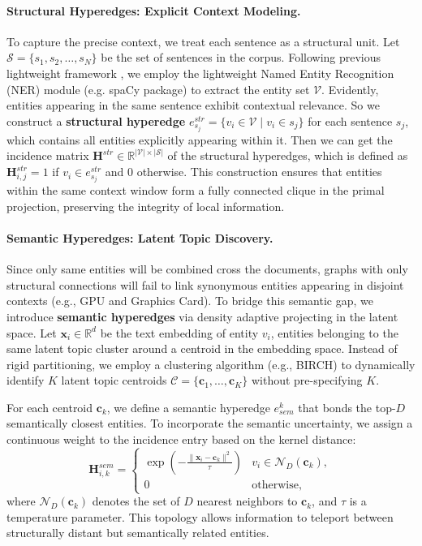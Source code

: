 \paragraph{Structural Hyperedges: Explicit Context Modeling.}
To capture the precise context, we treat each sentence as a structural unit. Let $\mathcal{S} = \{s_1, s_2, \dots, s_N\}$ be the set of sentences in the corpus. Following previous lightweight framework \cite{zhuang2025linearrag,zhao20252graphrag}, we employ the lightweight Named Entity Recognition (NER) module (e.g. spaCy package) to extract the entity set $\mathcal{V}$. Evidently, entities appearing in the same sentence exhibit contextual relevance. So we construct a \textbf{structural hyperedge} $e_{s_j}^{str} = \{v_i \in \mathcal{V} \mid v_i \in s_j\}$ for each sentence $s_j$, which contains all entities explicitly appearing within it. Then we can get the incidence matrix $\mathbf{H}^{str} \in \mathbb{R}^{|\mathcal{V}| \times |\mathcal{S}|}$ of the structural hyperedges, which is defined as $\mathbf{H}^{str}_{i, j} = 1$ if $v_i \in e_{s_j}^{str}$ and $0$ otherwise. This construction ensures that entities within the same context window form a fully connected clique in the primal projection, preserving the integrity of local information.

\paragraph{Semantic Hyperedges: Latent Topic Discovery.}
Since only same entities will be combined cross the documents, graphs with only structural connections will fail to link synonymous entities appearing in disjoint contexts (e.g., GPU and Graphics Card). To bridge this semantic gap, we introduce \textbf{semantic hyperedges} via density adaptive projecting in the latent space. Let $\mathbf{x}_i \in \mathbb{R}^d$ be the text embedding of entity $v_i$, entities belonging to the same latent topic cluster around a centroid in the embedding space. Instead of rigid partitioning, we employ a clustering algorithm (e.g., BIRCH) to dynamically identify $K$ latent topic centroids $\mathcal{C} = \{\mathbf{c}_1, \dots, \mathbf{c}_K\}$ without pre-specifying $K$.

For each centroid $\mathbf{c}_k$, we define a semantic hyperedge $e_{sem}^k$ that bonds the top-$D$ semantically closest entities. To incorporate the semantic uncertainty, we assign a continuous weight to the incidence entry based on the kernel distance:
\begin{equation}
    \mathbf{H}^{sem}_{i, k} = 
    \begin{cases} 
        \scriptstyle \exp\left(-\frac{\|\mathbf{x}_i - \mathbf{c}_k\|^2}{\tau}\right) & v_i \in \mathcal{N}_D(\mathbf{c}_k), \\
        \scriptstyle 0 & \text{otherwise},
    \end{cases}
\end{equation}
where $\mathcal{N}_D(\mathbf{c}_k)$ denotes the set of $D$ nearest neighbors to $\mathbf{c}_k$, and $\tau$ is a temperature parameter. This topology allows information to teleport between structurally distant but semantically related entities.

